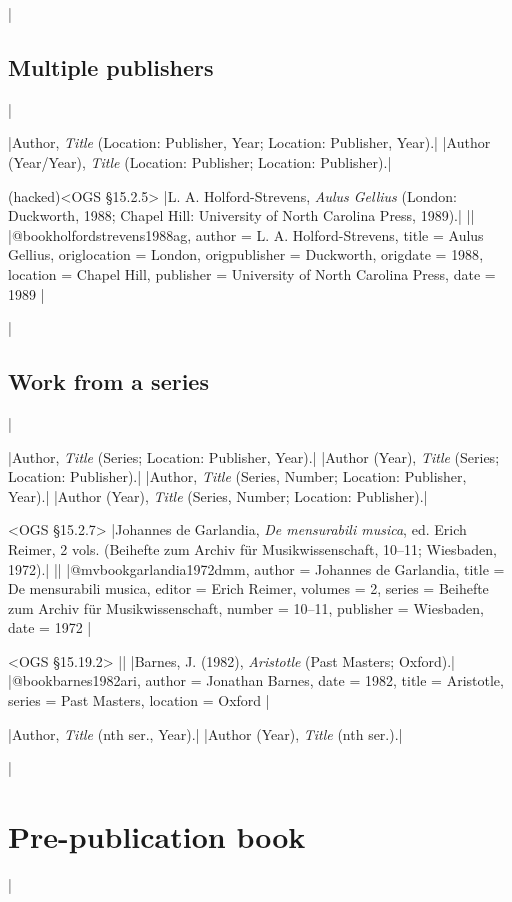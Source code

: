 \documentclass[extrafontsizes,11pt,a4paper,oneside]{memoir}
\newcommand*{\lit}[1]{\textsf{#1}}
\begin{document}
\todoc|
\subsection{Multiple publishers}
|

\specs
|Author, \emph{Title} (Location: Publisher, Year; Location: Publisher, Year).|%
|Author (Year/Year), \emph{Title} (Location: Publisher; Location: Publisher).|

\bibexample(hacked)<OGS \S15.2.5>
|L. A. Holford-Strevens, \emph{Aulus Gellius} (London: Duckworth, 1988; Chapel Hill: University of North Carolina Press, 1989).|%
||%
|@book{holfordstrevens1988ag,
  author = {L. A. Holford-Strevens},
  title = {Aulus Gellius},
  origlocation = {London},
  origpublisher = {Duckworth},
  origdate = {1988},
  location = {Chapel Hill},
  publisher = {University of North Carolina Press},
  date = {1989}
}|

\todoc|
\subsection{Work from a series}
|

\specs
|Author, \emph{Title} (Series; Location: Publisher, Year).|%
|Author (Year), \emph{Title} (Series; Location: Publisher).|
\specs
|Author, \emph{Title} (Series, Number; Location: Publisher, Year).|%
|Author (Year), \emph{Title} (Series, Number; Location: Publisher).|

\bibexample<OGS \S15.2.7>
|Johannes de Garlandia, \emph{De mensurabili musica}, ed. Erich Reimer, 2 vols. (Beihefte zum Archiv für Musikwissenschaft, 10--11; Wiesbaden, 1972).|%
||%
|@mvbook{garlandia1972dmm,
  author = {Johannes de Garlandia},
  title = {De mensurabili musica},
  editor = {Erich Reimer},
  volumes = {2},
  series = {Beihefte zum Archiv für Musikwissenschaft},
  number = {10--11},
  publisher = {Wiesbaden},
  date = {1972}
}|

\bibexample<OGS \S15.19.2>
||%
|Barnes, J. (1982), \emph{Aristotle} (Past Masters; Oxford).|%
|@book{barnes1982ari,
  author = {Jonathan Barnes},
  date = {1982},
  title = {Aristotle},
  series = {Past Masters},
  location = {Oxford}
}|

\specs
|Author, \emph{Title} (nth \lit{ser.}, Year).|%
|Author (Year), \emph{Title} (nth \lit{ser.}).|

\todoc|
\section{Pre-publication book}
|
\end{document}

